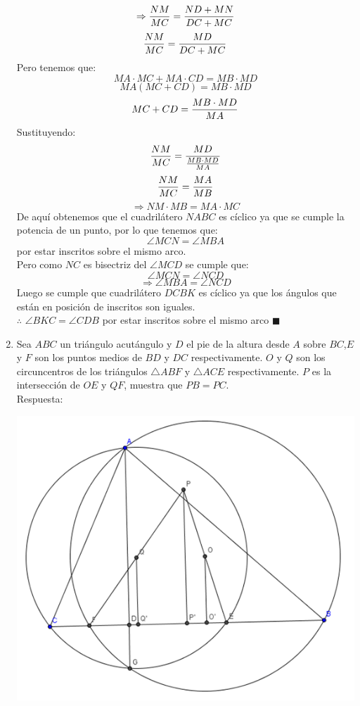 \documentclass{book}
\begin{document}
\begin{enumerate}
        $$\Rightarrow{NM\over MC}={ND+MN\over DC+MC}$$
        $${NM\over MC}={MD\over DC+MC}$$
        Pero tenemos que:
        $$MA\cdot MC + MA\cdot CD = MB\cdot MD$$
        $$MA( MC+CD) = MB\cdot MD$$
        $$MC+CD={ MB\cdot MD\over MA}$$
        Sustituyendo:
        $${NM\over MC}=\frac{MD}{{MB\cdot MD\over MA}}$$
        $${NM\over MC}={MA\over MB}$$
        $$\Rightarrow NM\cdot MB=MA\cdot MC$$
        De aquí obtenemos que el cuadrilátero $NABC$ es cíclico ya que se cumple la potencia de un punto, por lo que tenemos que:
        $$\angle MCN=\angle MBA$$
        por estar inscritos sobre el mismo arco.\\
        Pero como $NC$ es bisectriz del $\angle MCD$ se cumple que:
        $$\angle MCN=\angle NCD$$
        $$\Rightarrow \angle MBA=\angle NCD$$
        Luego se cumple que cuadrilátero $DCBK$ es cíclico ya que los ángulos que están en posición de inscritos son iguales.\\
        $\therefore$ $\angle BKC=\angle CDB$ por estar inscritos sobre el mismo arco $\blacksquare$\\
        \item Sea $ABC$ un triángulo acutángulo y $D$ el pie de la altura desde $A$ sobre $BC$,$E$ y $F$ son los puntos medios de $BD$ y $DC$ respectivamente. $O$ y $Q$ son los circuncentros de los triángulos $\triangle ABF$ y $\triangle ACE$ respectivamente. $P$ es la intersección de $OE$ y $QF$, muestra que $PB=PC$. \\
        Respuesta:
        \begin{center}
            \includegraphics[scale=1]{imagenes/Geometria/12.png}

\end{center}
\end{enumerate}
\end{document}
